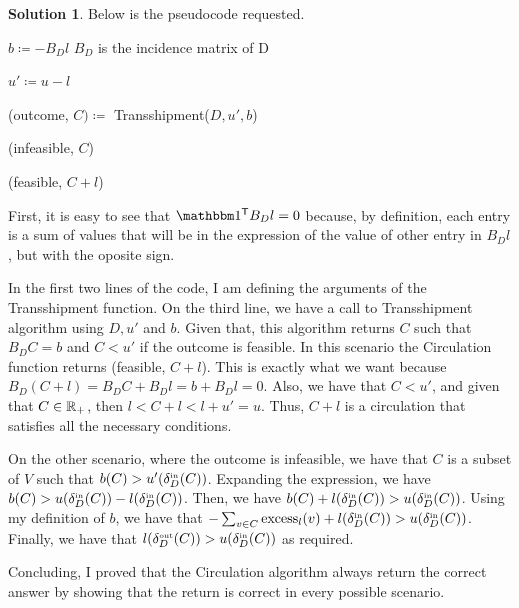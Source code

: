\documentclass[11pt,leqno,final]{amsart}
\theoremstyle{definition}
\newtheorem{solution}{Solution}
\begin{document}
\begin{solution}
Below is the pseudocode requested. 

\begin{algorithm}
  \caption{Circulation($D$, $l$, $u$)}\label{circ}
  \begin{algorithmic}

    \State $b \coloneqq - B_D l$ \Comment $B_D$ is the incidence matrix of D

    \State $u' \coloneqq u - l$

    \State (outcome, $C) \coloneqq$ Transshipment($D, u', b$)

              
      \State \Return (infeasible, $C$)  
    
    \EndIf 
    
    \State \Return (feasible, $C + l$)
      
  \end{algorithmic}
\end{algorithm}

First, it is easy to see that $\ones^{\transp} B_D l = 0$ because, by definition, each entry is a sum of values that will be in the expression of the value of other entry in $B_D l$, but with the oposite sign.

In the first two lines of the code, I am defining the arguments of the Transshipment function. On the third line, we have a call to Transshipment algorithm using $D, u'$ and $b$. Given that, this algorithm returns $C$ such that $B_D C = b$ and $C < u'$ if the outcome is feasible. In this scenario the Circulation function returns (feasible, $C + l$). This is exactly what we want because $B_D (C + l) = B_D C + B_D l = b + B_D l = 0$. Also, we have that $C < u'$, and given that $C \in \Reals_+$, then $l < C + l < l + u' = u$. Thus, $C + l$ is a circulation that satisfies all the necessary conditions.

On the other scenario, where the outcome is infeasible, we have that $C$ is a subset of $V$ such that $b(C) > u'(\deltain[D](C))$. Expanding the expression, we have $b(C) > u(\deltain[D](C)) - l(\deltain[D](C))$. Then, we have $b(C) + l(\deltain[D](C)) > u(\deltain[D](C))$. Using my definition of $b$, we have that $-\sum_{v \in C} \text{excess}_{l}(v) + l(\deltain[D](C)) > u(\deltain[D](C))$. Finally, we have that $l(\deltaout[D](C)) > u(\deltain[D](C))$ as required.

Concluding, I proved that the Circulation algorithm always return the correct answer by showing that the return is correct in every possible scenario.

\end{solution}
\end{document}

